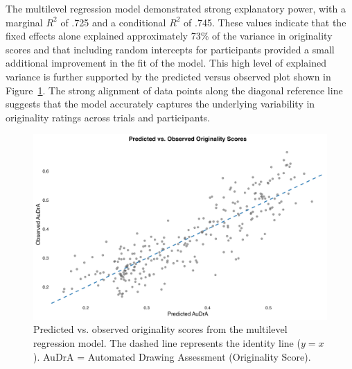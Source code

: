 \documentclass[../MA_Thesis.tex]{subfiles}
\begin{document}
The multilevel regression model demonstrated strong explanatory power, with a marginal $R^2$ of .725 and a conditional $R^2$ of .745. These values indicate that the fixed effects alone explained approximately 73\% of the variance in originality scores and that including random intercepts for participants provided a small additional improvement in the fit of the model. This high level of explained variance is further supported by the predicted versus observed plot shown in Figure~\ref{fig:predicted_vs_observed}. The strong alignment of data points along the diagonal reference line suggests that the model accurately captures the underlying variability in originality ratings across trials and participants.

\begin{figure}[H]
  \centering
  \includegraphics[width=\textwidth]{../analysis/results/main_results/multilevel_regression/predicted_vs_observed_plot.png}
  \caption{Predicted vs. observed originality scores from the multilevel regression model. The dashed line represents the identity line ($y = x$). AuDrA = Automated Drawing Assessment (Originality Score).}
  \label{fig:predicted_vs_observed}
\end{figure}
\end{document}
